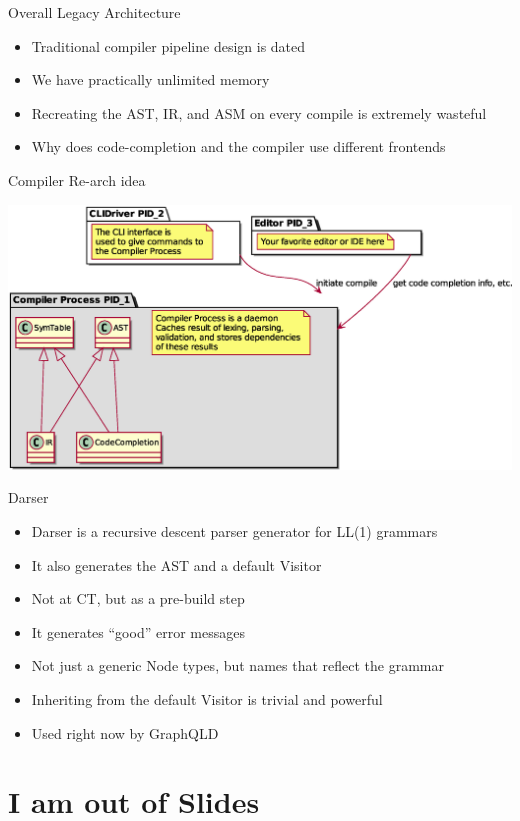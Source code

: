 \documentclass[aspectratio=169,notes]{beamer}
\begin{document}
	\begin{frame}[fragile]{Overall Legacy Architecture}
		\Large
		\begin{itemize}
			\item Traditional compiler pipeline design is dated
				\pause
			\item We have practically unlimited memory
			\item Recreating the AST, IR, and ASM on every compile is extremely wasteful
			\item Why does code-completion and the compiler use different frontends
		\end{itemize}
	\end{frame}

	\begin{frame}{Compiler Re-arch idea}
		\begin{center}
		\includegraphics[height=0.9\textheight]{rearch.eps}
		\end{center}
	\end{frame}

	\begin{frame}{Darser \hfill\cite{darser}}
		\begin{itemize}
			\item Darser is a recursive descent parser generator for LL(1) grammars
			\item It also generates the AST and a default Visitor
			\item Not at CT, but as a pre-build step\\[1cm]\pause
			\item It generates ``good'' error messages
			\item Not just a generic Node types, but names that reflect the grammar
			\item Inheriting from the default Visitor is trivial and powerful
			\item Used right now by GraphQLD
		\end{itemize}
	\end{frame}

	\section{I am out of Slides}
\end{document}
